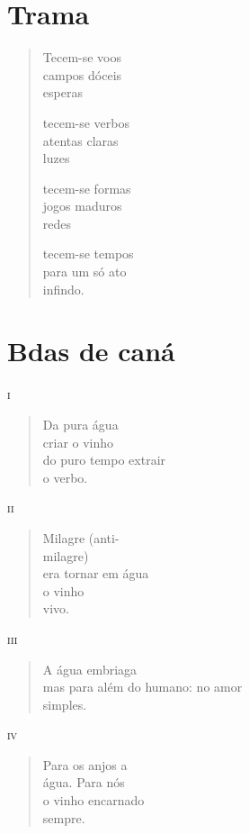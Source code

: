 \chapter{Trama}

\begin{verse}
Tecem-se voos\\
campos dóceis\\
esperas

tecem-se verbos\\
atentas claras\\
luzes

tecem-se formas\\
jogos maduros\\
redes

tecem-se tempos\\
para um só ato\\
infindo.
\end{verse}

\chapter{Bdas de caná}

\forceindent\textsc{i}
\begin{verse}
Da pura água\\
criar o vinho\\
do puro tempo extrair\\
o verbo.
\end{verse}

\medskip
\textsc{ii}

\begin{verse}
Milagre (anti-\\
milagre)\\
era tornar em água\\
o vinho\\
vivo.
\end{verse}

\medskip
\textsc{iii}

\begin{verse}
A água embriaga\\
mas para além do humano: no amor\\
simples.
\end{verse}

\medskip
\textsc{iv}

\begin{verse}
Para os anjos a\\
água. Para nós\\
o vinho encarnado\\
sempre.
\end{verse}

